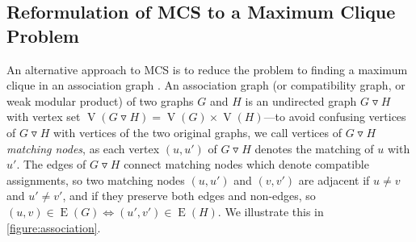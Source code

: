 \documentclass{llncs}
\newcommand{\modularproduct}{\operatorname{\triangledown}}
\begin{document}
\subsection{Reformulation of MCS to a Maximum Clique Problem}\label{clique}

An alternative approach to MCS is to reduce the problem to finding a maximum clique in an
association graph \cite{LeviG,bala86,dura99,DBLP:journals/jcamd/RaymondW02a}.
An association graph (or compatibility graph, or weak modular product) of two graphs $G$ and $H$ is
an undirected graph $G \modularproduct H$ with vertex set $\operatorname{V}(G \modularproduct H) =
\operatorname{V}(G) \times \operatorname{V}(H)$---to avoid confusing vertices of $G \modularproduct
H$ with vertices of the two original graphs, we call vertices of $G \modularproduct H$
\emph{matching nodes}, as each vertex $(u, u')$ of $G \modularproduct H$ denotes the matching of $u$
with $u'$. The edges of $G \modularproduct H$ connect matching nodes which denote compatible
assignments, so two matching nodes $(u, u')$ and  $(v, v')$ are adjacent if $u \neq v$ and $u' \neq
v'$, and if they preserve both edges and non-edges, so $(u, v) \in \operatorname{E}(G) \Leftrightarrow
(u', v') \in \operatorname{E}(H)$. We illustrate this in \cref{figure:association}.
\end{document}
